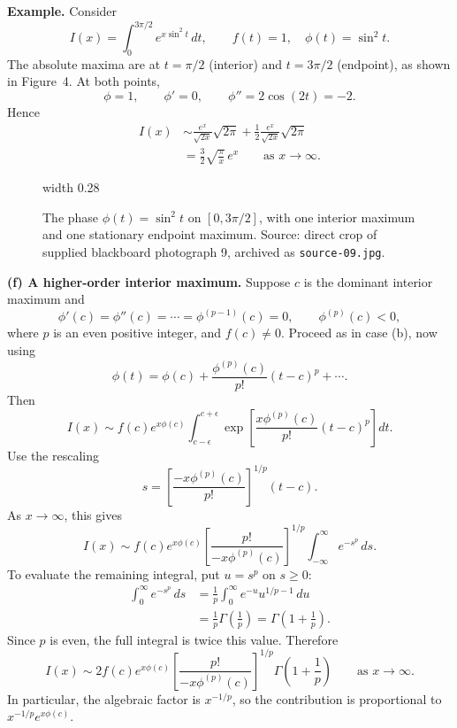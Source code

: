 \documentclass[11pt,a4paper]{article}
\begin{document}
\medskip
\noindent\textbf{Example.}
Consider
\[
    I(x)=\int_0^{3\pi/2}e^{x\sin^2t}\,dt,
    \qquad f(t)=1,\quad\phi(t)=\sin^2t.
\]
The absolute maxima are at $t=\pi/2$ (interior) and $t=3\pi/2$
(endpoint), as shown in Figure~4.
At both points,
\[
    \phi=1,\qquad\phi'=0,\qquad\phi''=2\cos(2t)=-2.
\]
Hence
\begin{align*}
    I(x)&\sim\frac{e^x}{\sqrt{2x}}\sqrt{2\pi}
    +\frac12\frac{e^x}{\sqrt{2x}}\sqrt{2\pi}\\
    &=\frac32\sqrt{\frac{\pi}{x}}\,e^x
    \qquad\text{as }x\to\infty.
\end{align*}
\begin{figure}[htbp]
    \centering
    \pdfximage width 0.28\linewidth {figures/asymptotic-lecture6/sin-squared.jpg}
    \pdfrefximage\pdflastximage
    \caption{The phase $\phi(t)=\sin^2t$ on $[0,3\pi/2]$, with one
    interior maximum and one stationary endpoint maximum. Source: direct
    crop of supplied blackboard photograph 9, archived as
    \texttt{source-09.jpg}.}
    \label{fig:am-lecture6-sin-squared}
\end{figure}

\medskip
\noindent\textbf{(f) A higher-order interior maximum.}
Suppose $c$ is the dominant interior maximum and
\[
    \phi'(c)=\phi''(c)=\cdots=\phi^{(p-1)}(c)=0,
    \qquad\phi^{(p)}(c)<0,
\]
where $p$ is an even positive integer, and $f(c)\neq0$.
Proceed as in case (b), now using
\[
    \phi(t)=\phi(c)+\frac{\phi^{(p)}(c)}{p!}(t-c)^p+\cdots.
\]
Then
\[
    I(x)\sim f(c)e^{x\phi(c)}
    \int_{c-\epsilon}^{c+\epsilon}
    \exp\!\left[\frac{x\phi^{(p)}(c)}{p!}(t-c)^p\right]dt.
\]
Use the rescaling
\[
    s=\left[\frac{-x\phi^{(p)}(c)}{p!}\right]^{1/p}(t-c).
\]
As $x\to\infty$, this gives
\[
    I(x)\sim f(c)e^{x\phi(c)}
    \left[\frac{p!}{-x\phi^{(p)}(c)}\right]^{1/p}
    \int_{-\infty}^{\infty}e^{-s^p}\,ds.
\]
To evaluate the remaining integral, put $u=s^p$ on $s\geq0$:
\begin{align*}
    \int_0^\infty e^{-s^p}\,ds
    &=\frac1p\int_0^\infty e^{-u}u^{1/p-1}\,du\\
    &=\frac1p\Gamma\!\left(\frac1p\right)
    =\Gamma\!\left(1+\frac1p\right).
\end{align*}
Since $p$ is even, the full integral is twice this value. Therefore
\[
    \boxed{I(x)\sim2f(c)e^{x\phi(c)}
    \left[\frac{p!}{-x\phi^{(p)}(c)}\right]^{1/p}
    \Gamma\!\left(1+\frac1p\right)}
    \qquad\text{as }x\to\infty.
\]
In particular, the algebraic factor is $x^{-1/p}$, so the contribution
is proportional to $x^{-1/p}e^{x\phi(c)}$.
\end{document}
